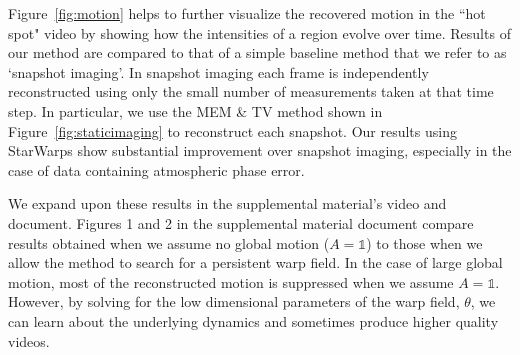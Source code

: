 Figure~\ref{fig:motion} helps to further visualize the recovered motion in the ``hot spot" video by showing how the intensities of a region evolve over time. Results of our method are compared to that of a simple baseline method that we refer to as `snapshot imaging'. In snapshot imaging each frame is independently reconstructed using only the small number of measurements taken at that time step.  In particular, we use the MEM \& TV method shown in Figure~\ref{fig:staticimaging} to reconstruct each snapshot. 
Our results using StarWarps show substantial improvement over snapshot imaging, especially in the case of data containing atmospheric phase error.


We expand upon these results in the supplemental material's video and document. 
Figures 1 and 2 in the supplemental material document compare results obtained when we assume no global motion ($A=\mathds{1}$) to those when we allow the method to search for a persistent warp field. %
In the case of large global motion, most of the reconstructed motion is suppressed when we assume $A=\mathds{1}$. However, by solving for the low dimensional parameters of the warp field, $\theta$, we can learn about the underlying dynamics and sometimes produce higher quality videos. %





















